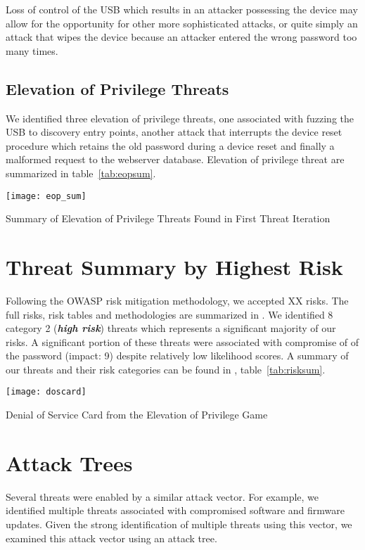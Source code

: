 Loss of control of the USB which results in an attacker possessing the device
may allow for the opportunity for other more sophisticated attacks, or quite
simply an attack that wipes the device because an attacker entered the wrong
password too many times.





\subsection{Elevation of Privilege Threats}
We identified three elevation of privilege threats, one associated with fuzzing
the USB to discovery entry points, another attack that interrupts the device
reset procedure which retains the old password during a device reset and finally a malformed request to the webserver database.  Elevation
of privilege threat are summarized in table~\ref{tab:eopsum}.


\begin{table*}[ht]
    \centering
    \texttt{[image: eop\_sum]}
    \caption{Summary of Elevation of Privilege Threats Found in First Threat Iteration}
    \label{tab:eopsum}
\end{table*}



\section{Threat Summary by Highest Risk}
Following the OWASP risk mitigation methodology, we accepted XX  risks.  The full risks, risk tables and methodologies are
summarized in . We identified 8 category 2 (\emph{\textbf{high risk}})
threats which represents a significant majority of our risks.  A significant
portion of these threats were associated with compromise of of the password
(impact: 9) despite relatively low likelihood scores.  A summary of our threats
and their risk categories can be found in , table~\ref{tab:risksum}.

\begin{marginfigure}%
\centering
  \texttt{[image: doscard]}
  \caption{Denial of Service Card from the Elevation of Privilege Game}
  \label{fig:doscard}
\end{marginfigure}


\section{Attack Trees}
Several threats were enabled by a similar attack vector.  For example, we
identified multiple threats associated with compromised software and firmware
updates.  Given the strong identification of multiple threats using this vector,
we examined this attack vector using an attack tree.

